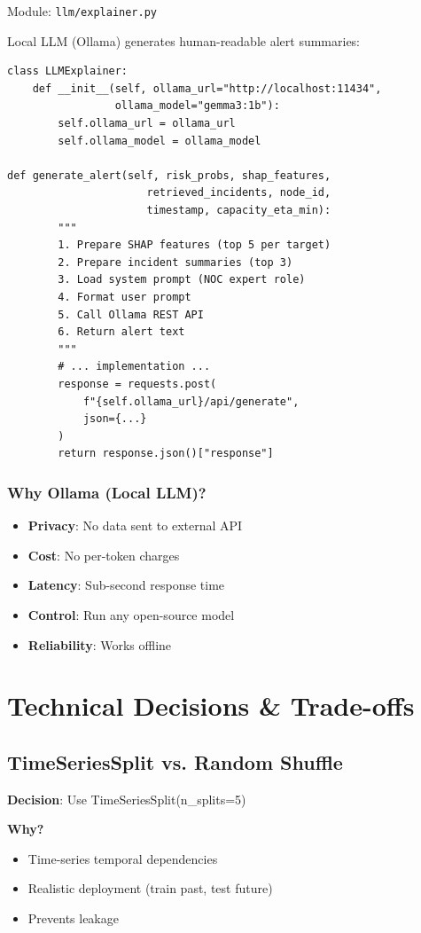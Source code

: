 \documentclass[11pt,a4paper,oneside]{report}
\begin{document}
Module: \texttt{llm/explainer.py}

Local LLM (Ollama) generates human-readable alert summaries:

\begin{lstlisting}
class LLMExplainer:
    def __init__(self, ollama_url="http://localhost:11434",
                 ollama_model="gemma3:1b"):
        self.ollama_url = ollama_url
        self.ollama_model = ollama_model

def generate_alert(self, risk_probs, shap_features,
                      retrieved_incidents, node_id,
                      timestamp, capacity_eta_min):
        """
        1. Prepare SHAP features (top 5 per target)
        2. Prepare incident summaries (top 3)
        3. Load system prompt (NOC expert role)
        4. Format user prompt
        5. Call Ollama REST API
        6. Return alert text
        """
        # ... implementation ...
        response = requests.post(
            f"{self.ollama_url}/api/generate",
            json={...}
        )
        return response.json()["response"]
\end{lstlisting}

\subsection{Why Ollama (Local LLM)?}

\begin{itemize}
    \item \textbf{Privacy}: No data sent to external API
    \item \textbf{Cost}: No per-token charges
    \item \textbf{Latency}: Sub-second response time
    \item \textbf{Control}: Run any open-source model
    \item \textbf{Reliability}: Works offline
\end{itemize}
\newpage
\chapter{Technical Decisions \& Trade-offs}

\section{TimeSeriesSplit vs. Random Shuffle}

\textbf{Decision}: Use TimeSeriesSplit(n\_splits=5)

\textbf{Why?}
\begin{itemize}
    \item Time-series temporal dependencies
    \item Realistic deployment (train past, test future)
    \item Prevents leakage
\end{itemize}
\end{document}
